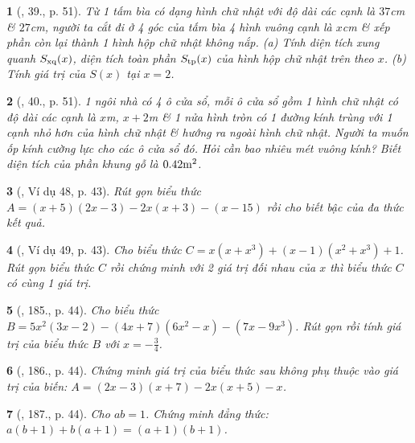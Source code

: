 \documentclass{article}
\newtheorem{baitoan}{}
\begin{document}
\begin{baitoan}[\cite{SBT_Toan_7_Canh_Dieu_tap_2}, 39., p. 51]
	Từ 1 tấm bìa có dạng hình chữ nhật với độ dài các cạnh là $37$\emph{cm} \& $27$\emph{cm}, người ta cắt đi ở 4 góc của tấm bìa 4 hình vuông cạnh là $x$\emph{cm} \& xếp phần còn lại thành 1 hình hộp chữ nhật không nắp. (a) Tính diện tích xung quanh $S_{\rm xq}(x)$, diện tích toàn phần $S_{\rm tp}(x)$ của hình hộp chữ nhật trên theo $x$. (b) Tính giá trị của $S(x)$ tại $x = 2$.
\end{baitoan}

\begin{baitoan}[\cite{SBT_Toan_7_Canh_Dieu_tap_2}, 40., p. 51]
	1 ngôi nhà có 4 ô cửa sổ, mỗi ô cửa sổ gồm 1 hình chữ nhật có độ dài các cạnh là $x$\emph{m}, $x + 2$\emph{m} \& 1 nửa hình tròn có 1 đường kính trùng với 1 cạnh nhỏ hơn của hình chữ nhật \& hướng ra ngoài hình chữ nhật. Người ta muốn ốp kính cường lực cho các ô cửa sổ đó. Hỏi cần bao nhiêu mét vuông kính? Biết diện tích của phần khung gỗ là $0.42{\rm m}^2$.
\end{baitoan}

\begin{baitoan}[\cite{Tuyen_Toan_7}, Ví dụ 48, p. 43]
	Rút gọn biểu thức $A =  (x + 5)(2x - 3) - 2x(x + 3) - (x - 15)$ rồi cho biết bậc của đa thức kết quả.
\end{baitoan}

\begin{baitoan}[\cite{Tuyen_Toan_7}, Ví dụ 49, p. 43]
	Cho biểu thức $C = x(x + x^3) + (x - 1)(x^2 + x^3) + 1$. Rút gọn biểu thức $C$ rồi chứng minh với 2 giá trị đối nhau của $x$ thì biểu thức $C$ có cùng 1 giá trị.
\end{baitoan}

\begin{baitoan}[\cite{Tuyen_Toan_7}, 185., p. 44]
	Cho biểu thức $B = 5x^2(3x - 2) - (4x + 7)(6x^2 - x) - (7x - 9x^3)$. Rút gọn rồi  tính giá trị của biểu thức $B$ với $x = -\frac{3}{4}$.
\end{baitoan}

\begin{baitoan}[\cite{Tuyen_Toan_7}, 186., p. 44]
	Chứng minh giá trị của biểu thức sau không phụ thuộc vào giá trị của biến: $A = (2x - 3)(x + 7) - 2x(x + 5) - x$. 
\end{baitoan}

\begin{baitoan}[\cite{Tuyen_Toan_7}, 187., p. 44]
	Cho $ab = 1$. Chứng minh đẳng thức: $a(b + 1) + b(a + 1) = (a + 1)(b + 1)$.
\end{baitoan}
\end{document}
